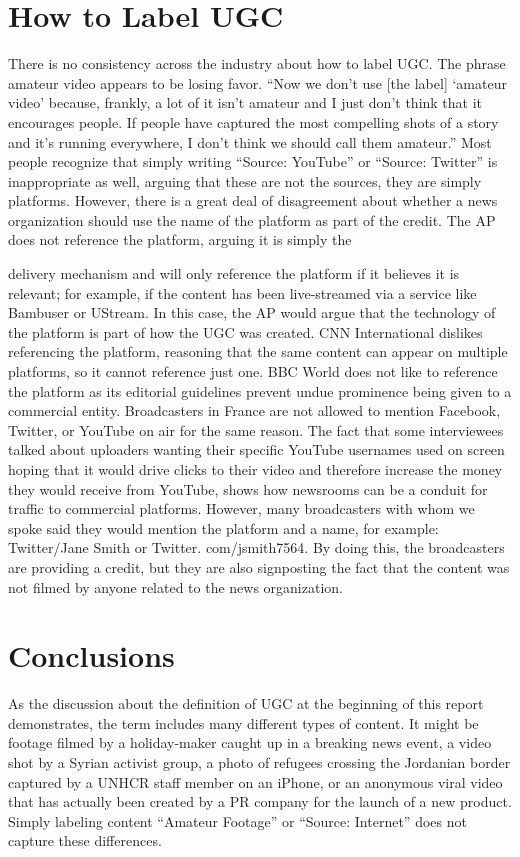\begin{enumerate}
\section{How to Label UGC}
There is no consistency across the industry about how to label UGC. The
phrase amateur video appears to be losing favor. ``Now we don't use [the
label] ‘amateur video' because, frankly, a lot of it isn't amateur and I just
don't think that it encourages people. If people have captured the most
compelling shots of a story and it's running everywhere, I don't think we
should call them amateur.''
Most people recognize that simply writing ``Source: YouTube'' or ``Source:
Twitter'' is inappropriate as well, arguing that these are not the sources, they
are simply platforms. However, there is a great deal of disagreement about
whether a news organization should use the name of the platform as part of
the credit. The AP does not reference the platform, arguing it is simply the

delivery mechanism and will only reference the platform if it believes it is
relevant; for example, if the content has been live-streamed via a service like
Bambuser or UStream. In this case, the AP would argue that the technology
of the platform is part of how the UGC was created.
CNN International dislikes referencing the platform, reasoning that the
same content can appear on multiple platforms, so it cannot reference
just one. BBC World does not like to reference the platform as its editorial
guidelines prevent undue prominence being given to a commercial entity.
Broadcasters in France are not allowed to mention Facebook, Twitter, or
YouTube on air for the same reason. The fact that some interviewees talked
about uploaders wanting their specific YouTube usernames used on screen
hoping that it would drive clicks to their video and therefore increase the
money they would receive from YouTube, shows how newsrooms can be a
conduit for traffic to commercial platforms.
However, many broadcasters with whom we spoke said they would mention
the platform and a name, for example: Twitter/Jane Smith or Twitter.
com/jsmith7564. By doing this, the broadcasters are providing a credit, but
they are also signposting the fact that the content was not filmed by anyone
related to the news organization.
\section{Conclusions}
As the discussion about the definition of UGC at the beginning of this
report demonstrates, the term includes many different types of content. It
might be footage filmed by a holiday-maker caught up in a breaking news
event, a video shot by a Syrian activist group, a photo of refugees crossing
the Jordanian border captured by a UNHCR staff member on an iPhone, or
an anonymous viral video that has actually been created by a PR company
for the launch of a new product. Simply labeling content ``Amateur Footage''
or ``Source: Internet'' does not capture these differences.


\end{enumerate}
